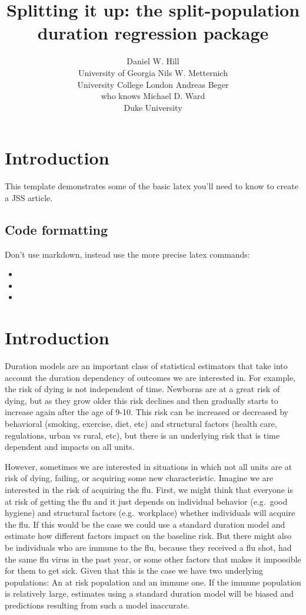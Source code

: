 \documentclass[article]{jss}
\author{
Daniel W. Hill\\University of Georgia \And Nils W. Metternich\\University College London \And Andreas Beger\\who knows \And Michael D. Ward\\Duke University
}
\title{Splitting it up: the \pkg{spduration} split-population duration
regression package}
\begin{document}
\section{Introduction}\label{introduction}

This template demonstrates some of the basic latex you'll need to know
to create a JSS article.

\subsection{Code formatting}\label{code-formatting}

Don't use markdown, instead use the more precise latex commands:

\begin{itemize}
\itemsep1pt\parskip0pt
\item
\item
\item
\end{itemize}

\section{Introduction}\label{introduction-1}

Duration models are an important class of statistical estimators that
take into account the duration dependency of outcomes we are interested
in. For example, the risk of dying is not independent of time. Newborns
are at a great risk of dying, but as they grow older this risk declines
and then gradually starts to increase again after the age of 9-10. This
risk can be increased or decreased by behavioral (smoking, exercise,
diet, etc) and structural factors (health care, regulations, urban vs
rural, etc), but there is an underlying risk that is time dependent and
impacts on all units.

However, sometimes we are interested in situations in which not all
units are at risk of dying, failing, or acquiring some new
characteristic. Imagine we are interested in the risk of acquiring the
flu. First, we might think that everyone is at risk of getting the flu
and it just depends on individual behavior (e.g.~good hygiene) and
structural factors (e.g.~workplace) whether individuals will acquire the
flu. If this would be the case we could use a standard duration model
and estimate how different factors impact on the baseline risk. But
there might also be individuals who are immune to the flu, because they
received a flu shot, had the same flu virus in the past year, or some
other factors that makes it impossible for them to get sick. Given that
this is the case we have two underlying populations: An at risk
population and an immune one. If the immune population is relatively
large, estimates using a standard duration model will be biased and
predictions resulting from such a model inaccurate.
\end{document}
